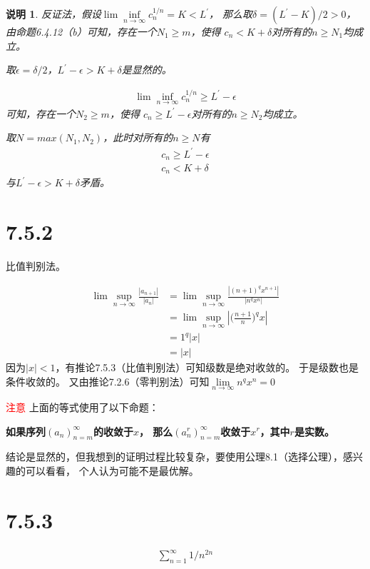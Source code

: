 \documentclass{article}
\theoremstyle{mystyle}
\newtheorem*{zremark}{说明}
\begin{document}
\begin{zremark}
  反证法，假设$\lim \inf\limits_{n \rightarrow \infty} c_n^{1/n} = K < L^\prime$，
  那么取$\delta = (L^\prime - K) /2  > 0$，由命题6.4.12（b）可知，存在一个$N_1 \geq m$，使得
  $c_n < K + \delta$对所有的$n \geq N_1$均成立。

  取$\epsilon = \delta /2$，$L^\prime - \epsilon > K + \delta$是显然的。

  \begin{align*}
    \lim \inf\limits_{n \rightarrow \infty} c_n^{1/n} \geq L^\prime - \epsilon
  \end{align*}可知，存在一个$N_2 \geq m$，使得
  $c_n \geq L^\prime - \epsilon$对所有的$n \geq N_2$均成立。

  取$N = max(N_1, N_2)$，此时对所有的$n \geq N$有
  \begin{align}
    c_n \geq L^\prime - \epsilon \\
    c_n < K + \delta
  \end{align}
  与$L^\prime - \epsilon > K + \delta$矛盾。
\end{zremark}

\section*{7.5.2}

比值判别法。

\begin{align*}
  \lim\sup\limits_{n \rightarrow \infty}\frac{|a_{n+1}|}{|a_{n}|}
   & = \lim\sup\limits_{n \rightarrow \infty}\frac{|(n+1)^qx^{n+1}|}{|n^qx^{n}|} \\
   & = \lim\sup\limits_{n \rightarrow \infty}|\big(\frac{n+1}{n}\big)^qx|        \\
   & = 1^q |x|                                                                  \\
   & = |x|
\end{align*}
因为$|x| < 1$，有推论7.5.3（比值判别法）可知级数是绝对收敛的。
于是级数也是条件收敛的。
又由推论7.2.6（零判别法）可知$\lim\limits_{n \rightarrow \infty}n^qx^n = 0$


\textcolor{red}{注意}
上面的等式使用了以下命题：

\textbf{如果序列$(a_n)_{n=m}^\infty$的收敛于$x$，
  那么$(a_n^r)_{n=m}^\infty$收敛于$x^r$，其中$r$是实数。}

结论是显然的，但我想到的证明过程比较复杂，要使用公理8.1（选择公理），感兴趣的可以看看，
个人认为可能不是最优解。




\section*{7.5.3}

\begin{align*}
  \sum \limits_{n=1}^\infty 1/n^{2n}
\end{align*}
\end{document}
